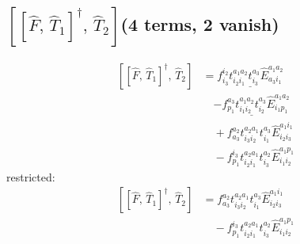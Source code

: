 \documentclass[11pt]{article}
\begin{document}
\subsection*{$\left[\left[\hat{F},\, \hat{T}_{1}\right]^{\dagger},\, \hat{T}_{2}\right]$\quad(4 terms, 2 vanish)}
\begin{align}
\left[\left[\hat{F},\, \hat{T}_{1}\right]^{\dagger},\, \hat{T}_{2}\right] &= \underline{f^{i_{2}}_{i_{3}} t^{a_{1}a_{2}}_{i_{2}i_{1}} t^{a_{3}}_{i_{3}} \hat{E}^{a_{1}a_{2}}_{a_{3}i_{1}}} \\
&\quad \underline{- f^{a_{3}}_{p_{1}} t^{a_{1}a_{2}}_{i_{1}i_{2}} t^{a_{3}}_{i_{2}} \hat{E}^{a_{1}a_{2}}_{i_{1}p_{1}}} \\
&\quad + f^{a_{2}}_{a_{3}} t^{a_{2}a_{1}}_{i_{3}i_{2}} t^{a_{3}}_{i_{1}} \hat{E}^{a_{1}i_{1}}_{i_{2}i_{3}} \\
&\quad - f^{i_{3}}_{p_{1}} t^{a_{2}a_{1}}_{i_{2}i_{1}} t^{a_{2}}_{i_{3}} \hat{E}^{a_{1}p_{1}}_{i_{1}i_{2}}
\end{align}
restricted:
\begin{align}
\left[\left[\hat{F},\, \hat{T}_{1}\right]^{\dagger},\, \hat{T}_{2}\right] &= f^{a_{2}}_{a_{3}} t^{a_{2}a_{1}}_{i_{3}i_{2}} t^{a_{3}}_{i_{1}} \hat{E}^{a_{1}i_{1}}_{i_{2}i_{3}} \\
&\quad - f^{i_{3}}_{p_{1}} t^{a_{2}a_{1}}_{i_{2}i_{1}} t^{a_{2}}_{i_{3}} \hat{E}^{a_{1}p_{1}}_{i_{1}i_{2}}
\end{align}
\end{document}
